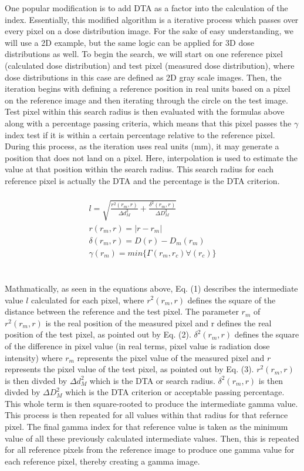 \documentclass[12pt]{article}
\begin{document}
One popular modification is to add DTA as a factor into the calculation of the index. Essentially, this modified algorithm is a iterative process which passes over every pixel on a dose distribution image. For the sake of easy understanding, we will use a 2D example, but the same logic can be applied for 3D dose distributions as well. To begin the search, we will start on one reference pixel (calculated dose distribution) and test pixel (measured dose distribution), where dose distributions in this case are defined as 2D gray scale images. Then, the iteration begins with defining a reference position in real units based on a pixel on the reference image and then iterating through the circle on the test image. Test pixel within this search radius is then evaluated with the formulas above along with a percentage passing criteria, which means that this pixel passes the $\gamma$ index test if it is within a certain percentage relative to the reference pixel. During this process, as the iteration uses real units (mm), it may generate a position that does not land on a pixel. Here, interpolation is used to estimate the value at that position within the search radius. This search radius for each reference pixel is actually the DTA and the percentage is the DTA criterion.
\\
\\
\begin{align}
  l = \sqrt{\frac{r^{2}(r_{m}, r)}{\Delta d^{2}_{M}} + \frac{\delta^{2}(r_{m}, r)}{\Delta D^{2}_{M}}} \\
  r(r_{m}, r) = \lvert r-r_{m} \lvert \\
  \delta(r_{m}, r) = D(r)-D_{m}(r_{m}) \\
  \gamma(r_{m}) = min\{\Gamma(r_{m}, r_{c})\forall(r_{c})\}
\end{align}
\\
\\
Mathmatically, as seen in the equations above, Eq. (1) describes the intermediate value $l$ calculated for each pixel, where $r^{2}(r_{m}, r)$ defines the square of the distance between the reference and the test pixel. The parameter $r_{m}$ of $r^{2}(r_{m}, r)$ is the real position of the measured pixel and r defines the real position of the test pixel, as pointed out by Eq. (2). $\delta^{2}(r_{m}, r)$ defines the square of the difference in pixel value (in real terms, pixel value is radiation dose intensity) where $r_{m}$ represents the pixel value of the measured pixel and $r$ represents the pixel value of the test pixel, as pointed out by Eq. (3). $r^{2}(r_{m}, r)$ is then divded by $\Delta d^{2}_{M}$ which is the DTA or search radius. $\delta^{2}(r_{m}, r)$ is then divded by $\Delta D^{2}_{M}$ which is the DTA criterion or acceptable passing percentage. This whole term is then square-rooted to produce the intermediate gamma value. This process is then repeated for all values within that radius for that refernce pixel. The final gamma index for that reference value is taken as the minimum value of all these previously calculated intermediate values. Then, this is repeated for all reference pixels from the reference image to produce one gamma value for each reference pixel, thereby creating a gamma image.
\end{document}

